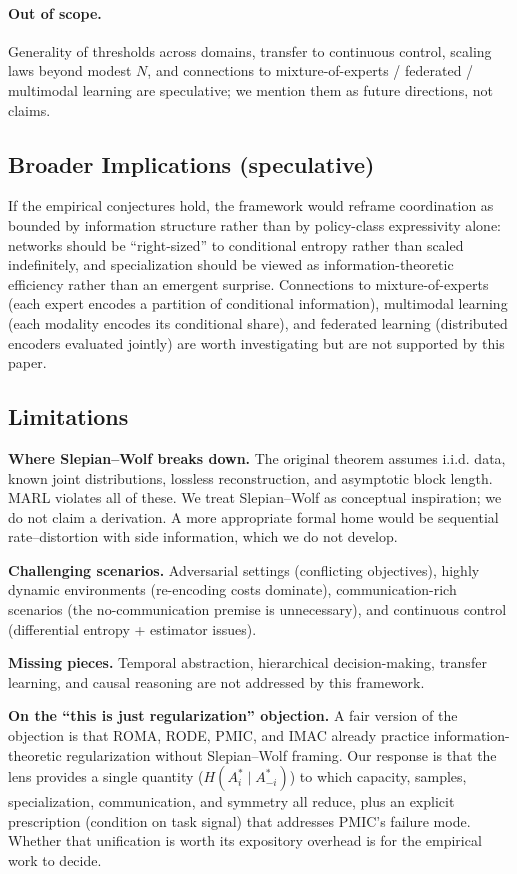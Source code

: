 \documentclass[10pt, letterpaper]{article}
\begin{document}
\paragraph{Out of scope.} Generality of thresholds across domains, transfer to continuous control, scaling laws beyond modest $N$, and connections to mixture-of-experts / federated / multimodal learning are speculative; we mention them as future directions, not claims.

\subsection{Broader Implications (speculative)}

If the empirical conjectures hold, the framework would reframe coordination as bounded by information structure rather than by policy-class expressivity alone: networks should be ``right-sized'' to conditional entropy rather than scaled indefinitely, and specialization should be viewed as information-theoretic efficiency rather than an emergent surprise. Connections to mixture-of-experts (each expert encodes a partition of conditional information), multimodal learning (each modality encodes its conditional share), and federated learning (distributed encoders evaluated jointly) are worth investigating but are not supported by this paper.

\subsection{Limitations}

\textbf{Where Slepian--Wolf breaks down.} The original theorem assumes i.i.d. data, known joint distributions, lossless reconstruction, and asymptotic block length. MARL violates all of these. We treat Slepian--Wolf as conceptual inspiration; we do not claim a derivation. A more appropriate formal home would be sequential rate--distortion with side information, which we do not develop.

\textbf{Challenging scenarios.} Adversarial settings (conflicting objectives), highly dynamic environments (re-encoding costs dominate), communication-rich scenarios (the no-communication premise is unnecessary), and continuous control (differential entropy + estimator issues).

\textbf{Missing pieces.} Temporal abstraction, hierarchical decision-making, transfer learning, and causal reasoning are not addressed by this framework.

\textbf{On the ``this is just regularization'' objection.} A fair version of the objection is that ROMA, RODE, PMIC, and IMAC already practice information-theoretic regularization without Slepian--Wolf framing. Our response is that the lens provides a single quantity ($H(A_i^*\mid A_{-i}^*)$) to which capacity, samples, specialization, communication, and symmetry all reduce, plus an explicit prescription (condition on task signal) that addresses PMIC's failure mode. Whether that unification is worth its expository overhead is for the empirical work to decide.
\end{document}
